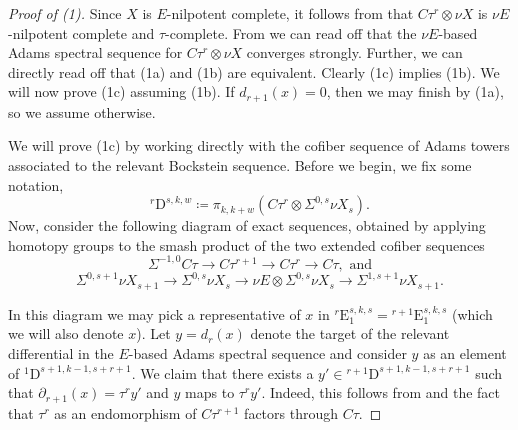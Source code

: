 \begin{proof}[Proof of (1)]
  Since $X$ is $E$-nilpotent complete, it follows from  that $C\tau^r \otimes \nu X$ is $\nu E$-nilpotent complete and $\tau$-complete. From  we can read off that the $\nu E$-based Adams spectral sequence for $C\tau^r \otimes \nu X$ converges strongly. Further, we can directly read off that (1a) and (1b) are equivalent. Clearly (1c) implies (1b). We will now prove (1c) assuming (1b).  If $d_{r+1}(x) = 0$, then we may finish by (1a), so we assume otherwise.

  We will prove (1c) by working directly with the cofiber sequence of Adams towers associated to the relevant Bockstein sequence. Before we begin, we fix some notation,
  $$ {}^r\mathrm{D}^{s,k,w} \coloneqq \pi_{k,k+w}( C\tau^r \otimes \Sigma^{0,s}\nu X_s ). $$
	Now, consider the following diagram of exact sequences, obtained by applying homotopy groups to the smash product of the two extended cofiber sequences
\[\Sigma^{-1,0} C\tau \to C\tau^{r+1} \to C\tau^{r} \to C\tau, \text{ and}\]
\[\Sigma^{0,s+1} \nu X_{s+1} \to \Sigma^{0,s} \nu X_{s} \to \nu E \otimes \Sigma^{0,s} \nu X_{s} \to \Sigma^{1,s+1} \nu X_{s+1}.\]
  \begin{center}
  \end{center}
	
  In this diagram we may pick a representative of $x$ in ${}^r\mathrm{E}_1^{s,k,s} = {}^{r+1}\mathrm{E}_1^{s,k,s}$ (which we will also denote $x$).
  Let $y = d_r(x)$ denote the target of the relevant differential in the $E$-based Adams spectral sequence and consider $y$ as an element of ${}^1\mathrm{D}^{s+1,k-1,s+r+1}$.
  We claim that there exists a $y' \in {}^{r+1}\mathrm{D}^{s+1,k-1,s+r+1}$ such that $\partial_{r+1} (x) = \tau^r y'$ and $y$ maps to $\tau^r y'$.
  Indeed, this follows from  and the fact that $\tau^r$ as an endomorphism of $C\tau^{r+1}$ factors through $C\tau$.


\end{proof}
